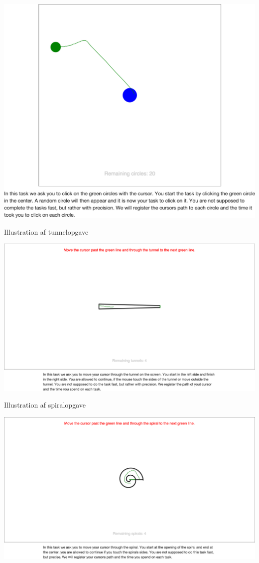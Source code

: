 \begin{minipage}[t]{.5\textwidth}
\centering
\vspace{0pt}
\includegraphics[width=\textwidth, trim = 7cm 20cm 15cm 5cm, clip]{images/screenshots/ex_step_6_pointing_path}
\label{fig:pegeopgave}
\caption{Illustration af tunnelopgave}
\includegraphics[width=\textwidth, trim = 25cm 15cm 25cm 10cm, clip]{images/screenshots/ex_step_4_tunnel_path}
\label{fig:tunnelopgaver}
\caption{Illustration af spiralopgave}
\includegraphics[width=\textwidth, trim = 25cm 15cm 25cm 10cm, clip]{images/screenshots/ex_step_5_spiral_path}
\label{fig:spiralopgave}

\end{minipage}\hfill
